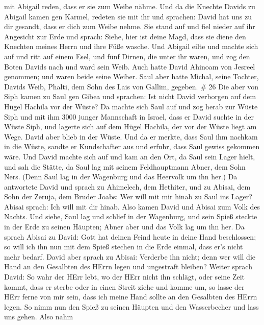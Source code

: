 mit Abigail reden, dass er sie zum Weibe nähme.  Und da die
Knechte Davids zu Abigail kamen gen Karmel, redeten sie mit ihr und
sprachen: David hat uns zu dir gesandt, dass er dich zum Weibe nehme.
 Sie stand auf und fiel nieder auf ihr Angesicht zur Erde
und sprach: Siehe, hier ist deine Magd, dass sie diene den Knechten
meines Herrn und ihre Füße wasche.  Und Abigail eilte und
machte sich auf und ritt auf einem Esel, und fünf Dirnen, die unter ihr
waren, und zog den Boten Davids nach und ward sein Weib. 
Auch hatte David Ahinoam von Jesreel genommen; und waren beide seine
Weiber.  Saul aber hatte Michal, seine Tochter, Davids
Weib, Phalti, dem Sohn des Lais von Gallim, gegeben. \# 26 
Die aber von Siph kamen zu Saul gen Gibea und sprachen: Ist nicht David
verborgen auf dem Hügel Hachila vor der Wüste?  Da machte
sich Saul auf und zog herab zur Wüste Siph und mit ihm 3000 junger
Mannschaft in Israel, dass er David suchte in der Wüste Siph,
 und lagerte sich auf dem Hügel Hachila, der vor der Wüste
liegt am Wege. David aber blieb in der Wüste. Und da er merkte, dass
Saul ihm nachkam in die Wüste,  sandte er Kundschafter aus
und erfuhr, dass Saul gewiss gekommen wäre.  Und David
machte sich auf und kam an den Ort, da Saul sein Lager hielt, und sah
die Stätte, da Saul lag mit seinem Feldhauptmann Abner, dem Sohn Ners.
(Denn Saul lag in der Wagenburg und das Heervolk um ihn her.)
 Da antwortete David und sprach zu Ahimelech, dem Hethiter,
und zu Abisai, dem Sohn der Zeruja, dem Bruder Joabs: Wer will mit mir
hinab zu Saul ins Lager? Abisai sprach: Ich will mit dir hinab.
 Also kamen David und Abisai zum Volk des Nachts. Und siehe,
Saul lag und schlief in der Wagenburg, und sein Spieß steckte in der
Erde zu seinen Häupten; Abner aber und das Volk lag um ihn her.
 Da sprach Abisai zu David: Gott hat deinen Feind heute in
deine Hand beschlossen; so will ich ihn nun mit dem Spieß stechen in die
Erde einmal, dass er's nicht mehr bedarf.  David aber sprach
zu Abisai: Verderbe ihn nicht; denn wer will die Hand an den Gesalbten
des HErrn legen und ungestraft bleiben?  Weiter sprach
David: So wahr der HErr lebt, wo der HErr nicht ihn schlägt, oder seine
Zeit kommt, dass er sterbe oder in einen Streit ziehe und komme um,
 so lasse der HErr ferne von mir sein, dass ich meine Hand
sollte an den Gesalbten des HErrn legen. So nimm nun den Spieß zu seinen
Häupten und den Wasserbecher und lass uns gehen.  Also nahm
